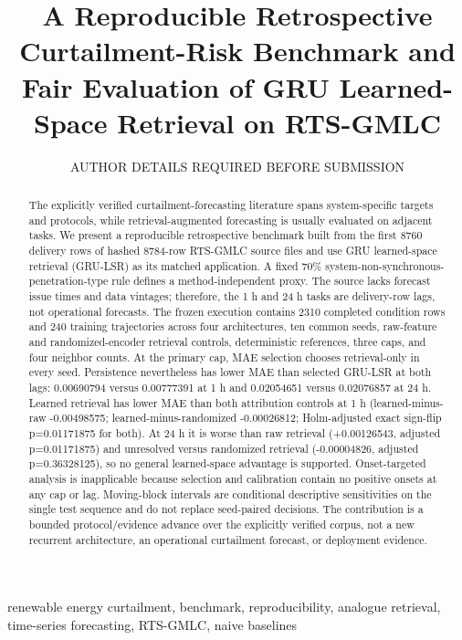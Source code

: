 \documentclass{ieeeaccess}
\begin{document}
\title{A Reproducible Retrospective Curtailment-Risk Benchmark and Fair Evaluation of GRU Learned-Space Retrieval on RTS-GMLC}
\author{\uppercase{Author Details Required before Submission}}
\address[1]{[AUTHOR INPUT REQUIRED: complete institutional addresses]}
\begin{abstract}
The explicitly verified curtailment-forecasting literature spans system-specific targets and protocols, while retrieval-augmented forecasting is usually evaluated on adjacent tasks. We present a reproducible retrospective benchmark built from the first 8760 delivery rows of hashed 8784-row RTS-GMLC source files and use GRU learned-space retrieval (GRU-LSR) as its matched application. A fixed 70\% system-non-synchronous-penetration-type rule defines a method-independent proxy. The source lacks forecast issue times and data vintages; therefore, the 1 h and 24 h tasks are delivery-row lags, not operational forecasts. The frozen execution contains 2310 completed condition rows and 240 training trajectories across four architectures, ten common seeds, raw-feature and randomized-encoder retrieval controls, deterministic references, three caps, and four neighbor counts. At the primary cap, MAE selection chooses retrieval-only in every seed. Persistence nevertheless has lower MAE than selected GRU-LSR at both lags: 0.00690794 versus 0.00777391 at 1 h and 0.02054651 versus 0.02076857 at 24 h. Learned retrieval has lower MAE than both attribution controls at 1 h (learned-minus-raw -0.00498575; learned-minus-randomized -0.00026812; Holm-adjusted exact sign-flip p=0.01171875 for both). At 24 h it is worse than raw retrieval (+0.00126543, adjusted p=0.01171875) and unresolved versus randomized retrieval (-0.00004826, adjusted p=0.36328125), so no general learned-space advantage is supported. Onset-targeted analysis is inapplicable because selection and calibration contain no positive onsets at any cap or lag. Moving-block intervals are conditional descriptive sensitivities on the single test sequence and do not replace seed-paired decisions. The contribution is a bounded protocol/evidence advance over the explicitly verified corpus, not a new recurrent architecture, an operational curtailment forecast, or deployment evidence.
\end{abstract}
\begin{keywords}
renewable energy curtailment, benchmark, reproducibility, analogue retrieval, time-series forecasting, RTS-GMLC, naive baselines
\end{keywords}
\maketitle
\end{document}
